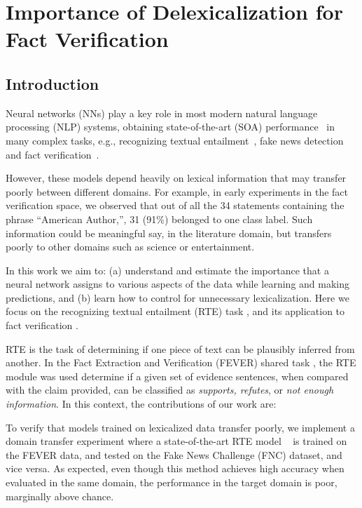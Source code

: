 \chapter{ Importance of Delexicalization for Fact Verification \label{chapter:emnlp2016}}

\section{Introduction}

Neural networks (NNs)  play a key role in most modern natural language processing (NLP) systems, obtaining state-of-the-art (SOA) performance~\citep{devlin2018bert, sun2018improving,bohnet2018morphosyntactic} in many complex tasks, e.g., recognizing textual entailment~\citep{kim2018semantic}, fake news detection~\citep{baird2017talos} and fact verification~\citep{nie2018combining}.

However, these models depend heavily on lexical information that may transfer poorly between different domains. For example, in early experiments in the fact verification space, we observed that out of all the 34 statements containing the phrase ``American Author,'', 31 (91\%) belonged to one class label. Such information could be meaningful say, in the literature domain, but transfers poorly to other domains such as science or entertainment.

In this work we aim to: (a) understand and estimate the importance that a neural network assigns to various aspects of the data while learning and making predictions, and (b) learn how to control for unnecessary lexicalization. Here we focus on the recognizing textual entailment (RTE) task \citep{dagan2013recognizing}, and its application to fact verification \citep{thorne2018fever, pomerleau2017fake}.

RTE is the task of determining if one piece of text can be plausibly inferred from another. In the Fact Extraction and Verification (FEVER) shared task \cite{thorne2018fever}, the RTE module was used determine if a given set of evidence sentences, when compared with the claim provided, can be classified as \textit{supports, refutes}, or \textit{not enough information}.
In this context, the contributions of our work are:

{} To verify that models trained on lexicalized data transfer poorly, we implement a domain transfer experiment where a state-of-the-art RTE model ~\cite{parikh2016decomposable}  is trained on the FEVER data, and tested on the Fake News Challenge (FNC) \citep{pomerleau2017fake}
dataset, and vice versa. As expected, even though this method achieves high accuracy when evaluated in the same domain, the performance in the target domain is poor, marginally above chance.


